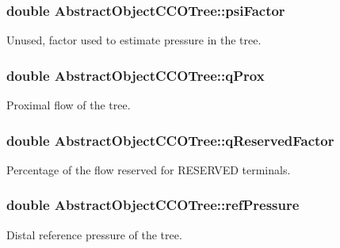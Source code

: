 \subsubsection[{\texorpdfstring{psi\+Factor}{psiFactor}}]{\setlength{\rightskip}{0pt plus 5cm}double Abstract\+Object\+C\+C\+O\+Tree\+::psi\+Factor\hspace{0.3cm}{\ttfamily [protected]}}\hypertarget{class_abstract_object_c_c_o_tree_ad29145c32f075e9c9db3cf1bd2a97b28}{}\label{class_abstract_object_c_c_o_tree_ad29145c32f075e9c9db3cf1bd2a97b28}
Unused, factor used to estimate pressure in the tree. 
\subsubsection[{\texorpdfstring{q\+Prox}{qProx}}]{\setlength{\rightskip}{0pt plus 5cm}double Abstract\+Object\+C\+C\+O\+Tree\+::q\+Prox\hspace{0.3cm}{\ttfamily [protected]}}\hypertarget{class_abstract_object_c_c_o_tree_a95cecfb158b008159b0885e4f434046f}{}\label{class_abstract_object_c_c_o_tree_a95cecfb158b008159b0885e4f434046f}
Proximal flow of the tree. 
\subsubsection[{\texorpdfstring{q\+Reserved\+Factor}{qReservedFactor}}]{\setlength{\rightskip}{0pt plus 5cm}double Abstract\+Object\+C\+C\+O\+Tree\+::q\+Reserved\+Factor\hspace{0.3cm}{\ttfamily [protected]}}\hypertarget{class_abstract_object_c_c_o_tree_aa7724194ea9aaa23352a459feaa8c38f}{}\label{class_abstract_object_c_c_o_tree_aa7724194ea9aaa23352a459feaa8c38f}
Percentage of the flow reserved for R\+E\+S\+E\+R\+V\+ED terminals. 
\subsubsection[{\texorpdfstring{ref\+Pressure}{refPressure}}]{\setlength{\rightskip}{0pt plus 5cm}double Abstract\+Object\+C\+C\+O\+Tree\+::ref\+Pressure\hspace{0.3cm}{\ttfamily [protected]}}\hypertarget{class_abstract_object_c_c_o_tree_ae7215e6237e4d04625a0c96be9f3578d}{}\label{class_abstract_object_c_c_o_tree_ae7215e6237e4d04625a0c96be9f3578d}
Distal reference pressure of the tree. 
